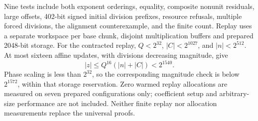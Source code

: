 \documentclass[11pt,letterpaper]{article}
\begin{document}
Nine tests include both exponent orderings, equality, composite nonunit
residuals, large offsets, 402-bit signed initial division prefixes,
resource refusals, multiple forced divisions, the alignment counterexample,
and the finite count. Replay uses a separate workspace per base chunk,
disjoint multiplication buffers and prepared 2048-bit storage.
For the contracted replay, \(Q<2^{32}\), \(|C|<2^{1027}\), and
\(|n|<2^{512}\). At most sixteen affine updates, with divisions decreasing
magnitude, give
\[
|z|\le Q^{16}(|n|+|C|)<2^{1540}.
\]
Phase scaling is less than \(2^{32}\), so the corresponding magnitude check
is below \(2^{1572}\), within that storage reservation. Zero warmed replay
allocations are measured on seven prepared configurations only; coefficient
setup and arbitrary-size performance are not included. Neither finite
replay nor allocation measurements replace the universal proofs.



\end{document}
